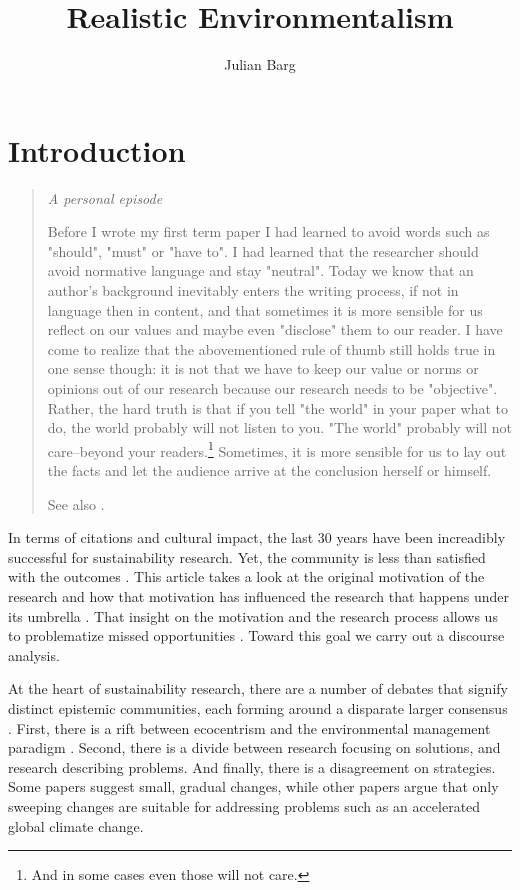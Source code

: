 \documentclass{article}
\title{Realistic Environmentalism}
\author{Julian Barg}
\begin{document}
	\maketitle

	\section*{Introduction}

	\begin{quote}
		\itshape
		A personal episode

		Before I wrote my first term paper I had learned to avoid words such as "should", "must" or "have to". I had learned that the researcher should avoid normative language and stay "neutral". Today we know that an author's background inevitably enters the writing process, if not in language then in content, and that sometimes it is more sensible for us reflect on our values and maybe even "disclose" them to our reader. I have come to realize that the abovementioned rule of thumb still holds true in one sense though: it is not that we have to keep our value or norms or opinions out of our research because our research needs to be "objective". Rather, the hard truth is that if you tell "the world" in your paper what to do, the world probably will not listen to you. "The world" probably will not care--beyond your readers.\footnote{And in some cases even those will not care.} Sometimes, it is more sensible for us to lay out the facts and let the audience arrive at the conclusion herself or himself.

		See also \citet{Gouldner1962,Zbaracki2021-02-03,Jones2019,Boisot2010}.
	\end{quote}

	In terms of citations and cultural impact, the last 30 years have been increadibly successful for sustainability research. Yet, the community is less than satisfied with the outcomes \cite[e.g.,][]{Ergene2020}. This article takes a look at the original motivation of the research and how that motivation has influenced the research that happens under its umbrella \citep{Latour1987}. That insight on the motivation and the research process allows us to problematize missed opportunities \citep{Alvesson2011}. Toward this goal we carry out a discourse analysis.

	At the heart of sustainability research, there are a number of debates that signify distinct epistemic communities, each forming around a disparate larger consensus \citep{KnorrCetina2000}. First, there is a rift between ecocentrism and the environmental management paradigm \citep{Purser1995}. Second, there is a divide between research focusing on solutions, and research describing problems. And finally, there is a disagreement on strategies. Some papers suggest small, gradual changes, while other papers argue that only sweeping changes are suitable for addressing problems such as an accelerated global climate change.
\end{document}
